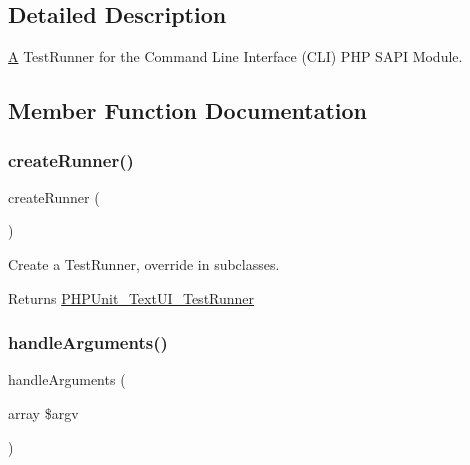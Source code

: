 \subsection{Detailed Description}
\mbox{\hyperlink{class_a}{A}} Test\+Runner for the Command Line Interface (C\+LI) P\+HP S\+A\+PI Module. 

\subsection{Member Function Documentation}
\mbox{\label{class_p_h_p_unit___text_u_i___command_a16a628a086f941d2a00d4cde917d1251}} 
\subsubsection{\texorpdfstring{create\+Runner()}{createRunner()}}
{\footnotesize\ttfamily create\+Runner (\begin{DoxyParamCaption}{ }\end{DoxyParamCaption})\hspace{0.3cm}{\ttfamily [protected]}}

Create a Test\+Runner, override in subclasses.

\begin{DoxyReturn}{Returns}
\mbox{\hyperlink{class_p_h_p_unit___text_u_i___test_runner}{P\+H\+P\+Unit\+\_\+\+Text\+U\+I\+\_\+\+Test\+Runner}} 
\end{DoxyReturn}
\mbox{\label{class_p_h_p_unit___text_u_i___command_aa31f6317c1f043c16d7524024ecc9445}} 
\subsubsection{\texorpdfstring{handle\+Arguments()}{handleArguments()}}
{\footnotesize\ttfamily handle\+Arguments (\begin{DoxyParamCaption}\item[{array}]{\$argv }\end{DoxyParamCaption})\hspace{0.3cm}{\ttfamily [protected]}}

